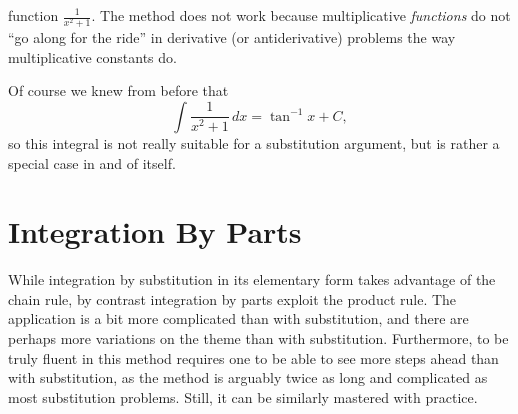 function $\frac1{x^2+1}$.  The method does not work because multiplicative
{\it functions} do not ``go along for the ride'' in derivative (or 
antiderivative) problems the way multiplicative constants do.

Of course we knew from before that 
$$\int\frac1{x^2+1}\,dx=\tan^{-1}x+C,$$
so this integral is not really suitable for a substitution argument, 
but is rather a special case in and of itself.  











\newpage
\section{Integration By Parts\label{IntByPartsSection}}

While integration by substitution in its elementary form
takes advantage of the chain rule, by contrast integration by
parts exploit the product rule. The application is a bit
more complicated than with substitution, and there are 
perhaps more variations on the theme than with substitution.
Furthermore, to be truly fluent in this method requires one to be able
to see more steps ahead than with substitution, as the method
is arguably twice as long and complicated as most substitution
problems.  Still, it can be similarly mastered with practice.

